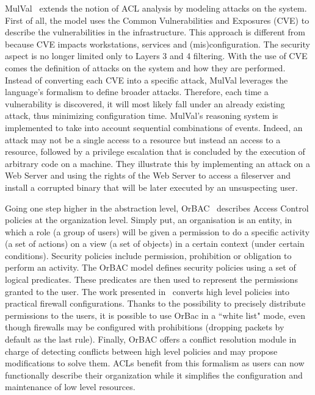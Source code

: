 MulVal~\cite{mulval-Ou2013} extends the notion of ACL analysis by modeling attacks on the system. First of all, the model uses the Common Vulnerabilities and Exposures (CVE) to describe the vulnerabilities in the infrastructure. This approach is different from~\cite{Matousek2008} because CVE impacts workstations, services and (mis)configuration. The security aspect is no longer limited only to Layers 3 and 4 filtering.
With the use of CVE comes the definition of attacks on the system and how they are performed.
Instead of converting each CVE into a specific attack, MulVal leverages the language's formalism to define broader attacks.
Therefore, each time a vulnerability is discovered, it will most likely fall under an already existing attack, thus minimizing configuration time.
MulVal's reasoning system is implemented to take into account sequential combinations of events.
Indeed, an attack may not be a single access to a resource but instead an access to a resource, followed by a privilege escalation that is concluded by the execution of arbitrary code on a machine.
They illustrate this by implementing an attack on a Web Server and using the rights of the Web Server to access a fileserver and install a corrupted binary that will be later executed by an unsuspecting user.

Going one step higher in the abstraction level, OrBAC~\cite{orbac} describes Access Control policies at the organization level. Simply put, an organisation is an entity, in which a role (\ie a group of users) will be given a permission to do a specific activity (\ie a set of actions) on a view (\ie a set of objects) in a certain context (\ie under certain conditions).
Security policies include permission, prohibition or obligation to perform an activity.
The OrBAC model defines security policies using a set of logical predicates. These predicates are then used to represent the permissions granted to the user.
The work presented in~\cite{Cuppens} converts high level policies into practical firewall configurations. Thanks to the possibility to precisely distribute permissions to the users, it is possible to use OrBac in a ``white list" mode, even though firewalls may be configured with prohibitions (\ie dropping packets by default as the last rule).
Finally, OrBAC offers a conflict resolution module in charge of detecting conflicts between high level policies and may propose modifications to solve them.
ACLs benefit from this formalism as users can now functionally describe their organization while it simplifies the configuration and maintenance of low level resources.

